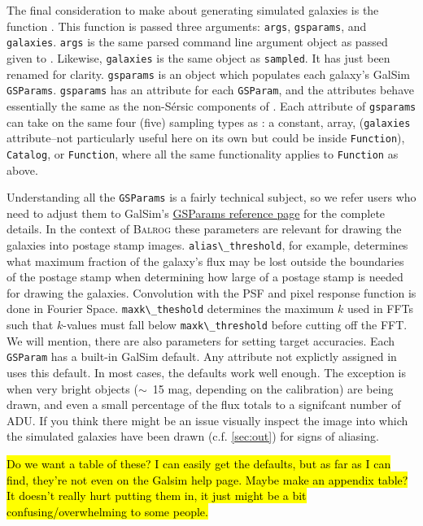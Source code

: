 \documentclass[12pt]{book}
\newcommand{\codett}[1]{\lstinline{#1}}
\newcommand{\galsim}{GalSim}
\newcommand{\balrog}{\textsc{Balrog}}
\newcommand{\sersic}{S\'{e}rsic}
\begin{document}
The final consideration to make about generating simulated galaxies is the function \gspfunc{}.
This function is passed three arguments: \codett{args}, \codett{gsparams}, and \codett{galaxies}.
\codett{args} is the same parsed command line argument object as passed given to \simfunc{}.
Likewise, \codett{galaxies} is the same object as \codett{sampled}.
It has just been renamed for clarity.
\codett{gsparams} is an object which populates each galaxy's \galsim{} \codett{GSParams}.
\codett{gsparams} has an attribute for each \codett{GSParam}, 
and the attributes behave essentially the same as the non-\sersic{} components of \simrules{}.
Each attribute of \codett{gsparams} can take on the same four (five) sampling types as \simrules{}:
a constant, array, (\codett{galaxies} attribute--not particularly useful here on its own but could be
inside \codett{Function}), \codett{Catalog}, or \codett{Function},
where all the same functionality applies to \codett{Function} as above.

Understanding all the \codett{GSParams} is a fairly technical subject, so we
refer users who need to adjust them to 
\galsim{}'s \href{http://galsim-developers.github.io/GalSim/structgalsim\_1\_1\_g\_s\_params.html}{GSParams reference page}
for the complete details.
In the context of \balrog{} these parameters are relevant for drawing the galaxies into postage stamp images.
\codett{alias\_threshold}, for example, determines what maximum fraction of the galaxy's flux may be lost outside the boundaries
of the postage stamp when determining how large of a postage stamp is needed for drawing the galaxies.
Convolution with the PSF and pixel response function is done in Fourier Space.
\codett{maxk\_theshold} determines the maximum $k$ used in FFTs such that $k$-values must fall below \codett{maxk\_threshold}
before cutting off the FFT. We will mention, there are also parameters for setting target accuracies.
Each \codett{GSParam} has a built-in \galsim{} default. Any attribute not explictly
assigned in \gspfunc{} uses this default.
In most cases, the defaults work well enough. The exception is when very bright objects ($\sim$~15 mag, depending on the calibration)
are being drawn, and even a small percentage of the flux totals to a signifcant number of ADU.
If you think there might be an issue visually inspect the image into which the simulated galaxies have been drawn (c.f. \autoref{sec:out})
for signs of aliasing.

\hl{Do we want a table of these? I can easily get the defaults, but as far as I can find, they're not even
on the Galsim help page. Maybe make an appendix table? It doesn't really hurt putting them in, it just might
be a bit confusing/overwhelming to some people.}
\end{document}
